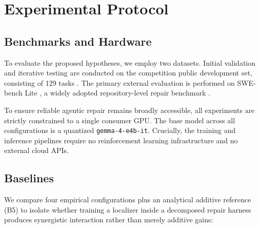\documentclass[11pt,a4paper]{article}
\begin{document}
\section{Experimental Protocol}

\subsection{Benchmarks and Hardware}
To evaluate the proposed hypotheses, we employ two datasets. Initial validation and iterative testing are conducted on the competition public development set, consisting of 129 tasks \cite{KAGGLE}. The primary external evaluation is performed on SWE-bench Lite \cite{SWEBENCHLITE}, a widely adopted repository-level repair benchmark \cite{SWEBENCH}.

To ensure reliable agentic repair remains broadly accessible, all experiments are strictly constrained to a single consumer GPU. The base model across all configurations is a quantized \texttt{gemma-4-e4b-it}. Crucially, the training and inference pipelines require no reinforcement learning infrastructure and no external cloud APIs.

\subsection{Baselines}
We compare four empirical configurations plus an analytical additive reference (B5) to isolate whether training a localizer inside a decomposed repair harness produces synergistic interaction rather than merely additive gains:
\end{document}

